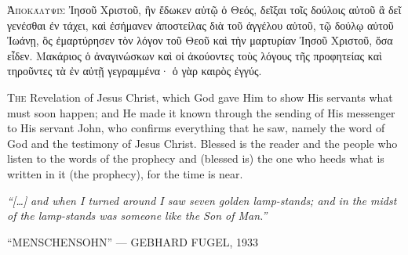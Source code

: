 \begin{pages}
    \begin{Rightside}
        \beginnumbering
		\renewcommand{\LettrineFontHook}{\PHtitl}
		\lettrine[lines=3]{Ἀ}{ποκάλυψις} Ἰησοῦ Χριστοῦ, ἣν ἔδωκεν αὐτῷ ὁ Θεός, δεῖξαι τοῖς δούλοις αὐτοῦ ἃ δεῖ γενέσθαι ἐν τάχει, καὶ ἐσήμανεν ἀποστείλας διὰ τοῦ ἀγγέλου αὐτοῦ, τῷ δούλῳ αὐτοῦ Ἰωάνῃ, ὃς ἐμαρτύρησεν τὸν λόγον τοῦ Θεοῦ καὶ τὴν μαρτυρίαν Ἰησοῦ Χριστοῦ, ὅσα εἶδεν. Μακάριος ὁ ἀναγινώσκων καὶ οἱ ἀκούοντες τοὺς λόγους τῆς προφητείας καὶ τηροῦντες τὰ ἐν αὐτῇ γεγραμμένα· ὁ γὰρ καιρὸς ἐγγύς.
		\pend
        \endnumbering
    \end{Rightside}
    \begin{Leftside}
        \beginnumbering
        		\renewcommand\LettrineFontHook{\Zallmanfamily}
			\lettrine[lines=3]{T}{he} Revelation of Jesus Christ, which God gave Him to show His servants what must soon happen; and He made it known through the sending of His messenger to His servant John, who confirms everything that he saw, namely the word of God and the testimony of Jesus Christ. Blessed is the reader and the people who listen to the words of the prophecy and (blessed is) the one who heeds what is written in it (the prophecy), for the time is near.
		\pend
        \endnumbering
    \end{Leftside}

\end{pages} 
\Pages

\clearpage
\thispagestyle{empty}
\null\vfill
\settowidth{}
\begin{center}
\parbox{\longest}{%
  \raggedright{\huge\itshape%
    ``[…] and when I turned around I saw seven golden lamp-stands; and in the midst of the lamp-stands was someone like the Son of Man.'' \par\bigskip
  }
  \raggedleft\Large\MakeUppercase{``Menschensohn'' — Gebhard Fugel, 1933}\par%
}
\vfill\vfill
\clearpage\newpage
\end{center}
\newpage
\thispagestyle{empty}
\begin{center}
\end{center}